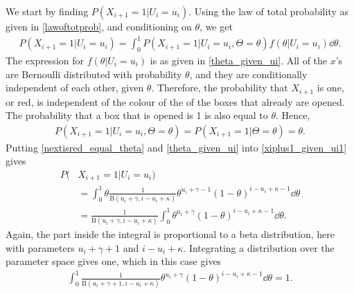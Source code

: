 We start by finding $P(X_{i+1}=1|U_i=u_i)$. Using the law of total probability as given in \eqref{lawoftotprob}, and conditioning on $\theta$, we get
\begin{equation}
\label{xiplus1_given_ui1}
    \begin{aligned}
        P(X_{i+1}=1|U_i=u_i)
        = \int_0^1 P(X_{i+1}=1|U_i=u_i,\Theta=\theta)f(\theta|U_i=u_i) \dd \theta.
    \end{aligned}
\end{equation}
The expression for $f(\theta|U_i=u_i)$ is as given in \eqref{theta_given_ui}. All of the $x$'s are Bernoulli distributed with probability $\theta$, and they are conditionally independent of each other, given $\theta$. Therefore, the probability that $X_{i+1}$ is one, or red, is independent of the colour of the of the boxes that already are opened. The probability that a box that is opened is 1 is also equal to $\theta$. Hence,
\begin{equation}
\label{nextisred_equal_theta}
    \begin{aligned}
        P(X_{i+1}=1|U_i=u_i,\Theta=\theta) = P(X_{i+1}=1|\Theta=\theta) = \theta.
    \end{aligned}
\end{equation}
Putting \eqref{nextisred_equal_theta} and \eqref{theta_given_ui} into \eqref{xiplus1_given_ui1} gives
\begin{equation}
\label{xiplus1_given_ui2}
    \begin{aligned}
        P(&X_{i+1}=1|U_i=u_i)\\
        &= \int_0^1 \theta \frac{1}{\text{B}(u_i+\gamma,i-u_i+\kappa)}\theta^{u_i+\gamma-1}(1-\theta)^{i-u_i+\kappa-1}  \dd \theta\\[6pt]
        &=\frac{1}{\text{B}(u_i+\gamma,i-u_i+\kappa)} \int_0^1 \theta^{u_i+\gamma}(1-\theta)^{i-u_i+\kappa-1} \dd \theta.
    \end{aligned}
\end{equation}
Again, the part inside the integral is proportional to a beta distribution, here with parameters $u_i+\gamma+1$ and $i-u_i+\kappa$. Integrating a distribution over the parameter space gives one, which in this case gives
\begin{equation*}
    \begin{aligned}
        \int_0^1 \frac{1}{\text{B}(u_i+\gamma+1,i-u_i+\kappa)} \theta^{u_i+\gamma}(1-\theta)^{i-u_i+\kappa-1}  \dd \theta = 1.
    \end{aligned}
\end{equation*}
